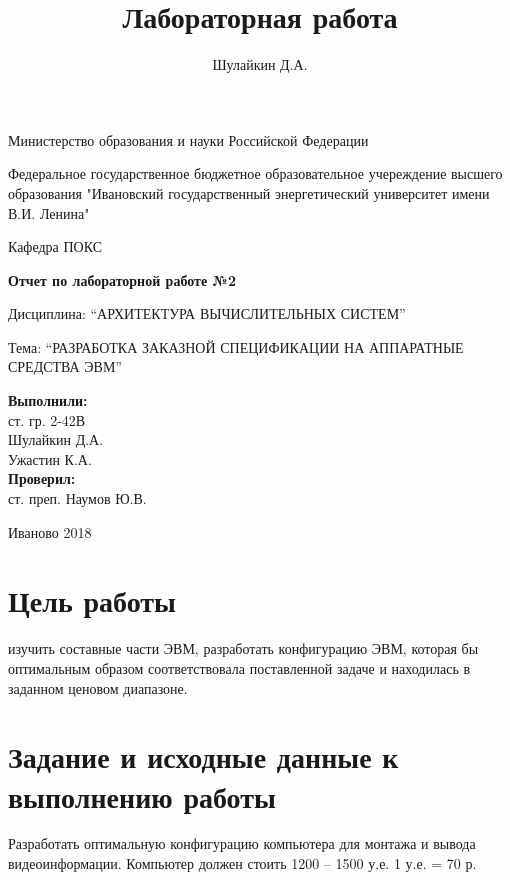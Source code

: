 \documentclass[a4paper]{article}
\title{Лабораторная работа}
\author{Шулайкин Д.А.}
\begin{document}
\onehalfspacing
\thispagestyle{empty}
\begin{center}
Министерство образования и науки Российской Федерации
\vspace{10pt}

Федеральное государственное бюджетное образовательное учереждение высшего образования "Ивановский государственный энергетический университет имени В.И. Ленина"
\vspace{40pt}

Кафедра ПОКС
\vspace{40pt}

\textbf{Отчет по лабораторной работе №2}

Дисциплина: ``АРХИТЕКТУРА ВЫЧИСЛИТЕЛЬНЫХ СИСТЕМ''

Тема: ``РАЗРАБОТКА ЗАКАЗНОЙ СПЕЦИФИКАЦИИ  НА АППАРАТНЫЕ СРЕДСТВА ЭВМ''

\end{center}

\vspace{330pt}
\begin{flushright}
\textbf{Выполнили:} \\
ст. гр. 2-42В \\
Шулайкин Д.А. \\
Ужастин К.А. \\

\textbf{Проверил:} \\
ст. преп. Наумов Ю.В.

\end{flushright}
\vspace{40pt}
\begin{center}
Иваново 2018
\end{center}
\pagebreak

\section{Цель работы} изучить составные части ЭВМ, разработать конфигурацию ЭВМ, которая бы оптимальным образом соответствовала поставленной задаче и находилась в заданном ценовом диапазоне.

\section{Задание и исходные данные к выполнению работы}
Разработать оптимальную конфигурацию компьютера для монтажа и вывода видеоинформации. Компьютер должен стоить 1200 – 1500 у.е. 1 у.е. = 70 р. \\
\end{document}
